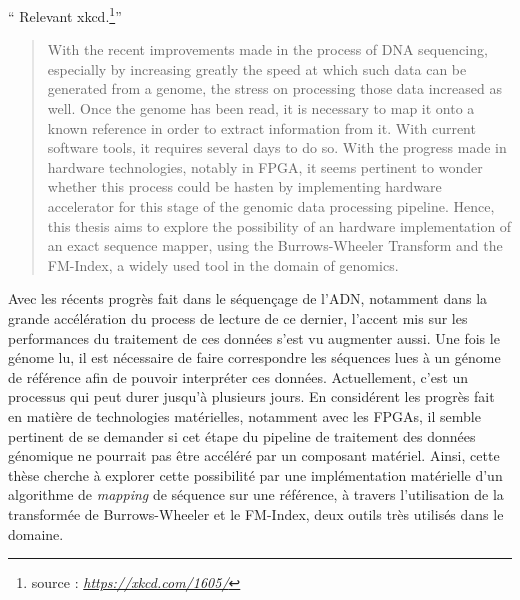 \documentclass[
11pt, %
english, %
singlespacing, %
headsepline, %
]{MastersDoctoralThesis} %
\begin{document}
\noindent\enquote{ Relevant xkcd.\footnote{source : \textit{\href{https://xkcd.com/1605/}{https://xkcd.com/1605/}}}}\bigbreak


\begin{abstract}
\addchaptertocentry{\abstractname{}} %
With the recent improvements made in the process of DNA sequencing, especially by increasing greatly the speed at which such data can be generated from a genome, the stress on processing those data increased as well. Once the genome has been read, it is necessary to map it onto a known reference in order to extract information from it. With current software tools, it requires several days to do so. With the progress made in hardware technologies, notably in FPGA, it seems pertinent to wonder whether this process could be hasten by implementing hardware accelerator for this stage of the genomic data processing pipeline. Hence, this thesis aims to explore the possibility of an hardware implementation of an exact sequence mapper, using the Burrows-Wheeler Transform and the FM-Index, a widely used tool in the domain of genomics.
\end{abstract}

\begin{extraAbstract}
Avec les récents progrès fait dans le séquençage de l'ADN, notamment dans la grande accélération du process de lecture de  ce dernier, l'accent mis sur les performances du traitement de ces données s'est vu augmenter aussi. Une fois le génome lu, il est nécessaire de faire correspondre les séquences lues à un génome de référence afin de pouvoir interpréter ces données. Actuellement, c'est un processus qui peut durer jusqu'à plusieurs jours. En considérent les progrès fait en matière de technologies matérielles, notamment avec les FPGAs, il semble pertinent de se demander si cet étape du pipeline de traitement des données génomique ne pourrait pas être accéléré par un composant matériel. Ainsi, cette thèse cherche à explorer cette possibilité par une implémentation matérielle d'un algorithme de \textit{mapping} de séquence sur une référence, à travers l'utilisation de la transformée de Burrows-Wheeler et le FM-Index, deux outils très utilisés dans le domaine.
\end{extraAbstract}
\newpage
\end{document}

